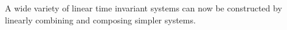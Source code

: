 \documentclass[11pt,a4paper]{book}
\theoremstyle{plain}
\numberwithin{equation}{section}
\newcommand{\term}{\textbf}
\begin{document}
A wide variety of linear time invariant systems can now be constructed by linearly combining and composing simpler systems.  




\end{document}
